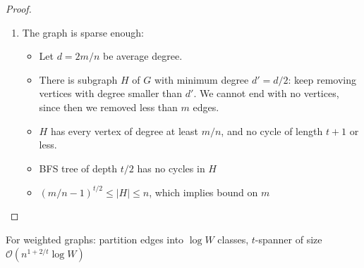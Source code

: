 \documentclass[11pt]{article}
\newcommand{\bigo}{\mathcal{O}}
\begin{document}
\begin{proof}
\begin{enumerate}
\begin{proof}
\begin{itemize}
		\item As we now have a counterexample where $|P_G|=1$ and $|P_H|>t|P_G|=t$, we arrive at a contradiction: when we were processing the only edge on $P_G$, we should have added it to $H$ as it didn't cause a cycle of length $\leq t+1$ - it doesn't cause that now as $d_H(u,v) = |P_H| \geq t+1$ and in the time of processing of that edge it also didn't as $H$ at that time was a subgraph of the final $H$.
	\end{itemize}
\end{proof}
\item The graph is sparse enough:
\begin{itemize}
\item Let $d = 2m/n$ be average degree.
\item There is subgraph $H$ of $G$ with minimum degree $d' = d/2$: keep removing vertices with degree smaller than $d'$. We cannot end with no vertices, since then we removed less than $m$ edges.
\item $H$ has every vertex of degree at least $m/n$, and no cycle of length $t+1$ or less.
\item BFS tree of depth $t/2$ has no cycles in $H$
\item $(m/n-1)^{t/2} \le |H| \le n$, which implies bound on $m$
\end{itemize}
\end{enumerate}
\end{proof}

For weighted graphs: partition edges into $\log W$ classes, $t$-spanner of size $\bigo(n^{1+2/t} \log W)$
\end{document}
